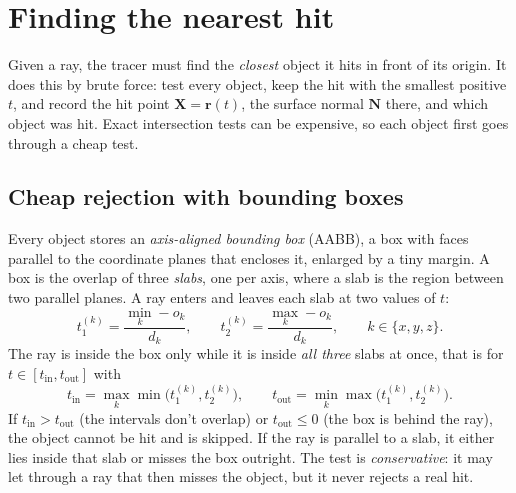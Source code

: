 \documentclass[11pt,a4paper]{article}
\newcommand{\vv}[1]{\mathbf{#1}}
\begin{document}
\section{Finding the nearest hit}

Given a ray, the tracer must find the \emph{closest} object it hits in front of
its origin. It does this by brute force: test every object, keep the hit with the
smallest positive $t$, and record the hit point $\vv X = \vv r(t)$, the surface
normal $\vv N$ there, and which object was hit. Exact intersection tests can be
expensive, so each object first goes through a cheap test.

\subsection{Cheap rejection with bounding boxes}

Every object stores an \emph{axis-aligned bounding box} (AABB), a box with faces
parallel to the coordinate planes that encloses it, enlarged by a tiny margin. A
box is the overlap of three \emph{slabs}, one per axis, where a slab is the
region between two parallel planes. A ray enters and leaves each slab at two
values of $t$:
\[
  t_1^{(k)} = \frac{\min_k - o_k}{d_k},\qquad t_2^{(k)} = \frac{\max_k - o_k}{d_k},
  \qquad k\in\{x,y,z\}.
\]
The ray is inside the box only while it is inside \emph{all three} slabs at
once, that is for $t\in[t_{\text{in}}, t_{\text{out}}]$ with
\[
  t_{\text{in}} = \max_k \min\big(t_1^{(k)},t_2^{(k)}\big),\qquad
  t_{\text{out}} = \min_k \max\big(t_1^{(k)},t_2^{(k)}\big).
\]
If $t_{\text{in}}>t_{\text{out}}$ (the intervals don't overlap) or
$t_{\text{out}}\le 0$ (the box is behind the ray), the object cannot be hit and
is skipped. If the ray is parallel to a slab, it either lies inside that slab or
misses the box outright. The test is \emph{conservative}: it may let through a
ray that then misses the object, but it never rejects a real hit.
\end{document}
